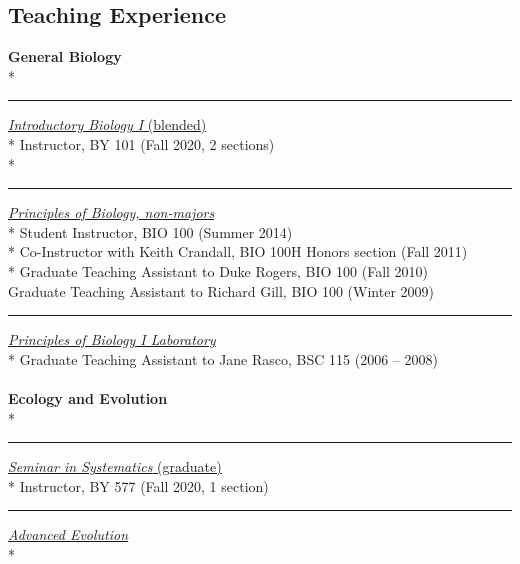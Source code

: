 \documentclass[margin,line]{res}
\begin{document}
\begin{resume}

\section{\sc Teaching Experience}
\textbf{General Biology}\\*
\rule{-1mm}{5mm} \hspace*{4mm} \href{http://www.jsu.edu/biology/}{\textit{Introductory Biology I} (blended)}\\*
\hspace*{8mm} Instructor, BY 101 (Fall 2020, 2 sections)\\*
\\
\rule{-1mm}{5mm} \hspace*{4mm} \href{http://catalog.byu.edu/life-sciences/biology/principles-of-biology}{\textit{Principles of Biology, non-majors}}\\*
\hspace*{8mm} Student Instructor, BIO 100 (Summer 2014)\\*
\hspace*{8mm} Co-Instructor with Keith Crandall, BIO 100H Honors section (Fall 2011)\\*
\hspace*{8mm} Graduate Teaching Assistant to Duke Rogers, BIO 100 (Fall 2010)\\
\hspace*{8mm} Graduate Teaching Assistant to Richard Gill, BIO 100 (Winter 2009)\\
\rule{-1mm}{5mm} \hspace*{4mm} \href{http://catalog.byu.edu/life-sciences/biology/principles-of-biology}{\textit{Principles of Biology I Laboratory}}\\*
\hspace*{8mm} Graduate Teaching Assistant to Jane Rasco, BSC 115 (2006 -- 2008)\\
~\\
\textbf{Ecology and Evolution}\\*
\rule{-1mm}{5mm} \hspace*{4mm} \href{http://bulletin.umsl.edu/coursesofinstruction/biol/}{\textit{Seminar in Systematics} (graduate)}\\*
\hspace*{8mm} Instructor, BY 577 (Fall 2020, 1 section)\\
\rule{-1mm}{5mm} \hspace*{4mm} \href{http://bulletin.umsl.edu/coursesofinstruction/biol/}{\textit{Advanced Evolution}}\\*

\end{resume}
\end{document}

